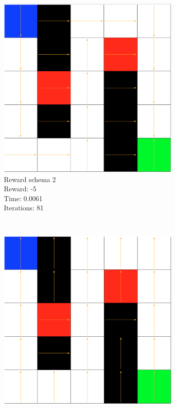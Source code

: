 \documentclass[a4paper,10pt]{article}
\begin{document}
\begin{figure}[h!]
        \begin{subfigure}[b]{0.3\textwidth}
                \includegraphics[width=\textwidth]{figures/5x5_viter_r2.png}
                \caption{Reward schema 2\\
                Reward: -5 \\
                Time:  0.0061\\
                Iterations: 81}
                \label{fig:tiger}
        \end{subfigure}
        ~ %
        \begin{subfigure}[b]{0.3\textwidth}
                \includegraphics[width=\textwidth]{figures/5x5_viter_r3.png}

\end{subfigure}
\end{figure}
\end{document}
